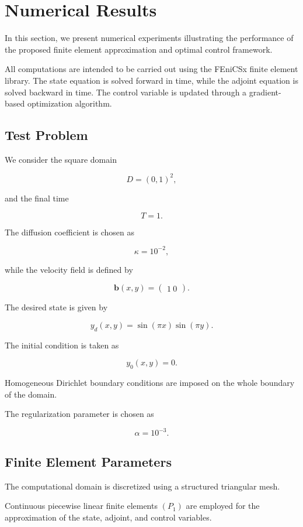 \section{Numerical Results}

In this section, we present numerical experiments illustrating the performance of the proposed 
finite element approximation and optimal control framework.

All computations are intended to be carried out using the FEniCSx finite element library. 
The state equation is solved forward in time, while the adjoint equation is solved backward 
in time. The control variable is updated through a gradient-based optimization algorithm.

\subsection{Test Problem}

We consider the square domain

\[
D=(0,1)^2,
\]

and the final time

\[
T=1.
\]

The diffusion coefficient is chosen as

\[
\kappa = 10^{-2},
\]

while the velocity field is defined by

\[
\mathbf b(x,y)
=
\begin{pmatrix}
1 \
0
\end{pmatrix}.
\]

The desired state is given by

\[
y_d(x,y)
=
\sin(\pi x)\sin(\pi y).
\]

The initial condition is taken as

\[
y_0(x,y)=0.
\]

Homogeneous Dirichlet boundary conditions are imposed on the whole boundary of the domain.

The regularization parameter is chosen as

\[
\alpha =10^{-3}.
\]

\subsection{Finite Element Parameters}

The computational domain is discretized using a structured triangular mesh.

Continuous piecewise linear finite elements \((P_1)\) are employed for the approximation of the state, 
adjoint, and control variables.

